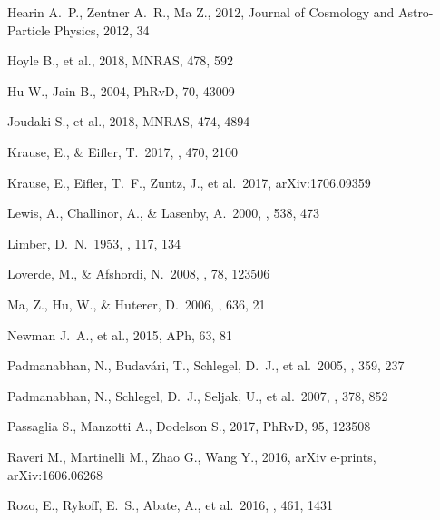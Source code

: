 \documentclass[a4paper,fleqn,usenatbib]{mnras}
\begin{document}
\begin{thebibliography}{99}
 Hearin A.~P., Zentner A.~R., Ma Z., 2012, Journal of Cosmology and Astro-Particle Physics, 2012, 34

 Hoyle B., et al., 2018, MNRAS, 478, 592

 Hu W., Jain B., 2004, PhRvD, 70, 43009

 Joudaki S., et al., 2018, MNRAS, 474, 4894

 Krause, E., \& Eifler, T.\ 2017, \mnras, 470, 2100 

 Krause, E., Eifler, T.~F., Zuntz, J., et al.\ 2017, arXiv:1706.09359 

 Lewis, A., Challinor, A., \& Lasenby, A.\ 2000, \apj, 538, 473 

 Limber, D.~N.\ 1953, \apj, 117, 134 

 Loverde, M., \& Afshordi, N.\ 2008, \prd, 78, 123506 

 Ma, Z., Hu, W., \& Huterer, D.\ 2006, \apj, 636, 21 

 Newman J.~A., et al., 2015, APh, 63, 81


 Padmanabhan, N., Budav{\'a}ri, T., Schlegel, D.~J., et al.\ 2005, \mnras, 359, 237

 Padmanabhan, N., Schlegel, D.~J., Seljak, U., et al.\ 2007, \mnras, 378, 852 

 Passaglia S., Manzotti A., Dodelson S., 2017, PhRvD, 95, 123508

 Raveri M., Martinelli M., Zhao G., Wang Y., 2016, arXiv e-prints, arXiv:1606.06268

 Rozo, E., Rykoff, E.~S., Abate, A., et al.\ 2016, \mnras, 461, 1431


\end{thebibliography}
\end{document}
